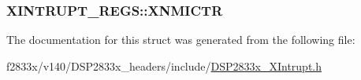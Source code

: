 \subsubsection[{X\+N\+M\+I\+C\+T\+R}]{ X\+I\+N\+T\+R\+U\+P\+T\+\_\+\+R\+E\+G\+S\+::\+X\+N\+M\+I\+C\+T\+R}\label{struct_x_i_n_t_r_u_p_t___r_e_g_s_ab72281dd2b73679801189052647e6edc}


The documentation for this struct was generated from the following file\+:\begin{DoxyCompactItemize}
\item 
f2833x/v140/\+D\+S\+P2833x\+\_\+headers/include/\hyperlink{_d_s_p2833x___x_intrupt_8h}{D\+S\+P2833x\+\_\+\+X\+Intrupt.\+h}\end{DoxyCompactItemize}

